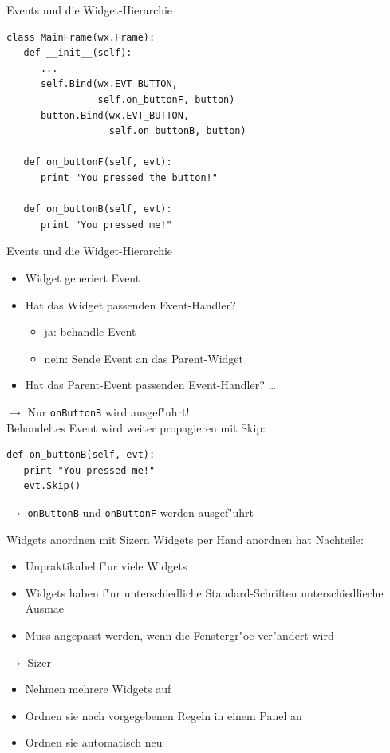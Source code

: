 \begin{frame}[fragile]{Events und die Widget-Hierarchie}
\begin{lstlisting}[style=Python]
class MainFrame(wx.Frame):
   def __init__(self):
      ...
      self.Bind(wx.EVT_BUTTON,
                self.on_buttonF, button)
      button.Bind(wx.EVT_BUTTON,
                  self.on_buttonB, button)

   def on_buttonF(self, evt):
      print "You pressed the button!"

   def on_buttonB(self, evt):
      print "You pressed me!"
\end{lstlisting}
\end{frame}

\begin{frame}[fragile]{Events und die Widget-Hierarchie}
\begin{itemize}
\item Widget generiert Event
\item Hat das Widget passenden Event-Handler?
  \begin{itemize} 
    \item{ja}: behandle Event
    \item{nein}: Sende Event an das Parent-Widget
  \end{itemize}
\item Hat das Parent-Event passenden Event-Handler? \dots
\end{itemize}
$\rightarrow$ Nur \lstinline{onButtonB} wird ausgef"uhrt!\\[3mm]

Behandeltes Event wird weiter propagieren mit \alert{Skip}:
\begin{lstlisting}[style=Python]
def on_buttonB(self, evt):
   print "You pressed me!"
   evt.Skip()
\end{lstlisting}
$\rightarrow$ \lstinline{onButtonB} und \lstinline{onButtonF} werden ausgef"uhrt
\end{frame}

\begin{frame}{Widgets anordnen mit Sizern}
Widgets per Hand anordnen hat Nachteile:
\begin{itemize}
\item Unpraktikabel f"ur viele Widgets
\item Widgets haben f"ur unterschiedliche Standard-Schriften unterschiedlieche Ausma\3e
\item Muss angepasst werden, wenn die Fenstergr"o\3e ver"andert wird
\end{itemize}
$\rightarrow$ \alert{Sizer}
\begin{itemize}
\item Nehmen mehrere Widgets auf
\item Ordnen sie nach vorgegebenen Regeln in einem Panel an
\item Ordnen sie automatisch neu
\end{itemize}
\end{frame}

